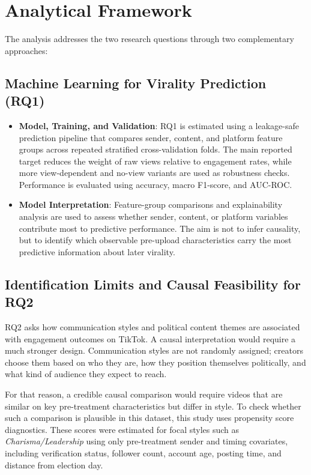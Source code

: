 \documentclass[12pt,a4paper]{report}
\begin{document}
\section{Analytical Framework}

The analysis addresses the two research questions through two complementary approaches:

\subsection{Machine Learning for Virality Prediction (RQ1)}
\begin{itemize}
    \item \textbf{Model, Training, and Validation}: RQ1 is estimated using a leakage-safe prediction pipeline that compares sender, content, and platform feature groups across repeated stratified cross-validation folds. The main reported target reduces the weight of raw views relative to engagement rates, while more view-dependent and no-view variants are used as robustness checks. Performance is evaluated using accuracy, macro F1-score, and AUC-ROC.
    
    \item \textbf{Model Interpretation}: Feature-group comparisons and explainability analysis are used to assess whether sender, content, or platform variables contribute most to predictive performance. The aim is not to infer causality, but to identify which observable pre-upload characteristics carry the most predictive information about later virality.
\end{itemize}

\subsection{Identification Limits and Causal Feasibility for RQ2}
\label{sec:rq2_identification}

RQ2 asks how communication styles and political content themes are associated
with engagement outcomes on TikTok. A causal interpretation would require a much
stronger design. Communication styles are not randomly assigned; creators choose
them based on who they are, how they position themselves politically, and what
kind of audience they expect to reach.

For that reason, a credible causal comparison would require videos that are
similar on key pre-treatment characteristics but differ in style. To check
whether such a comparison is plausible in this dataset, this study uses
propensity score diagnostics. These scores were estimated for focal styles such
as \textit{Charisma/Leadership} using only pre-treatment sender and timing
covariates, including verification status, follower count, account age, posting
time, and distance from election day.
\end{document}
